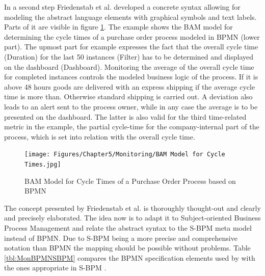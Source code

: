 In a second step Friedenstab et al. developed a concrete syntax allowing for modeling the abstract language elements with graphical symbols and text labels. Parts of it are visible in figure \ref{fig:Model-Cycle-Times}. The example shows the BAM model for determining the cycle times of a purchase order process modeled in BPMN (lower part). The upmost part for example expresses the fact that the overall cycle time (Duration) for the last 50 instances (Filter) has to be determined and displayed on the dashboard (Dashboard). Monitoring the average of the overall cycle time for completed instances controls the modeled business logic of the process. If it is above 48 hours goods are delivered with an express shipping if the average cycle time is more than. Otherwise standard shipping is carried out. A deviation also leads to an alert sent to the process owner, while in any case the average is to be presented on the dashboard. The latter is also valid for the third time-related metric in the example, the partial cycle-time for the company-internal part of the process, which is set into relation with the overall cycle time.

\begin{figure}[htbp]
	\centering
	\texttt{[image: Figures/Chapter5/Monitoring/BAM Model for Cycle Times.jpg]}
	\caption[BAM Model for Cycle Times of a Purchase Order Process based on BPMN 12]{BAM Model for Cycle Times of a Purchase Order Process based on BPMN \cite{article:BPMNActivityMon}}
	\label{fig:Model-Cycle-Times}
\end{figure}


The concept presented by Friedenstab et al. is thoroughly thought-out and clearly and precisely elaborated. The idea now is to adapt it to Subject-oriented Business Process Management and relate the abstract syntax to the S-BPM meta model instead of BPMN. Due to S-BPM being a more precise and comprehensive notation than BPMN \cite{article:BPMNYAWLPatterns} the mapping should be possible without problems. Table \ref{tbl:MonBPMNSBPM} compares the BPMN specification elements used by \cite{article:BPMNActivityMon} with the ones appropriate in S-BPM \cite{Flei12}.


